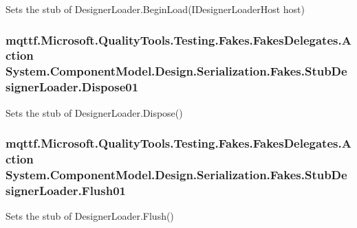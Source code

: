 Sets the stub of Designer\-Loader.\-Begin\-Load(\-I\-Designer\-Loader\-Host host)

\hypertarget{class_system_1_1_component_model_1_1_design_1_1_serialization_1_1_fakes_1_1_stub_designer_loader_ac036bb8ab81e77a972a9571c8d04a844}{
\subsubsection[{Dispose01}]{\setlength{\rightskip}{0pt plus 5cm}mqttf.\-Microsoft.\-Quality\-Tools.\-Testing.\-Fakes.\-Fakes\-Delegates.\-Action System.\-Component\-Model.\-Design.\-Serialization.\-Fakes.\-Stub\-Designer\-Loader.\-Dispose01}}\label{class_system_1_1_component_model_1_1_design_1_1_serialization_1_1_fakes_1_1_stub_designer_loader_ac036bb8ab81e77a972a9571c8d04a844}


Sets the stub of Designer\-Loader.\-Dispose()

\hypertarget{class_system_1_1_component_model_1_1_design_1_1_serialization_1_1_fakes_1_1_stub_designer_loader_afda96122fcc54b923ad308c06bd3d3db}{
\subsubsection[{Flush01}]{\setlength{\rightskip}{0pt plus 5cm}mqttf.\-Microsoft.\-Quality\-Tools.\-Testing.\-Fakes.\-Fakes\-Delegates.\-Action System.\-Component\-Model.\-Design.\-Serialization.\-Fakes.\-Stub\-Designer\-Loader.\-Flush01}}\label{class_system_1_1_component_model_1_1_design_1_1_serialization_1_1_fakes_1_1_stub_designer_loader_afda96122fcc54b923ad308c06bd3d3db}


Sets the stub of Designer\-Loader.\-Flush()

